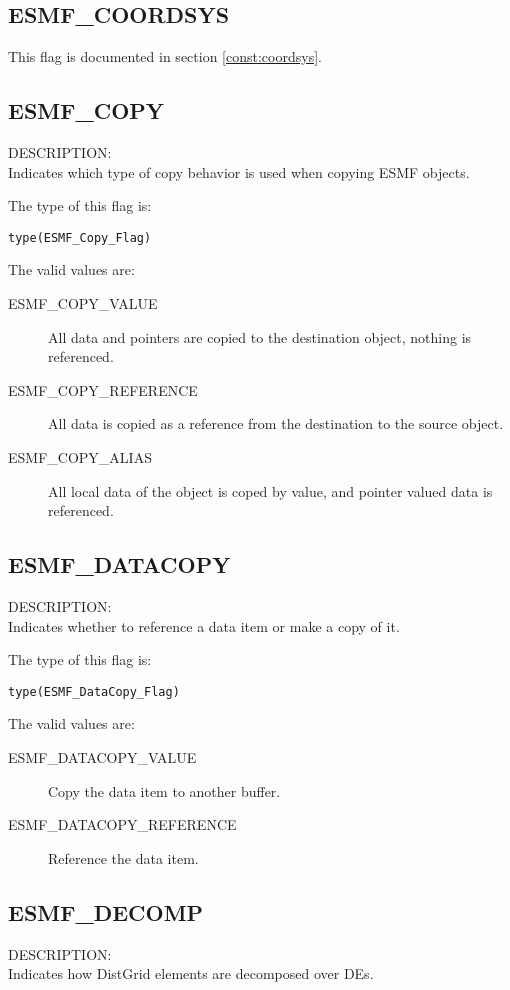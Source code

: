 \subsection{ESMF\_COORDSYS}
This flag is documented in section \ref{const:coordsys}.

\subsection{ESMF\_COPY}
\label{const:copy}
{\sf DESCRIPTION:\\}
Indicates which type of copy behavior is used when copying ESMF objects.

The type of this flag is:

{\tt type(ESMF\_Copy\_Flag)}

The valid values are:
\begin{description}
	\item[ESMF\_COPY\_VALUE]
	All data and pointers are copied to the destination object, nothing is referenced.
	\item[ESMF\_COPY\_REFERENCE]
	All data is copied as a reference from the destination to the source object.
	\item[ESMF\_COPY\_ALIAS]
	All local data of the object is coped by value, and pointer valued data is referenced.
\end{description}

\subsection{ESMF\_DATACOPY}
\label{const:datacopyflag}
{\sf DESCRIPTION:\\}
Indicates whether to reference a data item or make a copy of it.

The type of this flag is:

{\tt type(ESMF\_DataCopy\_Flag)}

The valid values are:
\begin{description}
\item [ESMF\_DATACOPY\_VALUE]
      Copy the data item to another buffer.
\item [ESMF\_DATACOPY\_REFERENCE]
      Reference the data item.
\end{description}

\subsection{ESMF\_DECOMP}
\label{const:decompflag}
{\sf DESCRIPTION:\\}
Indicates how DistGrid elements are decomposed over DEs.

